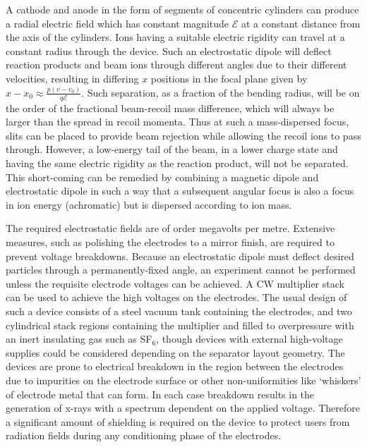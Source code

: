 A cathode and anode in the form of segments of concentric cylinders can produce a radial electric field which has constant magnitude $\mathcal{E}$  at a constant distance from the axis of the cylinders.   Ions having a suitable electric rigidity can travel at a constant radius through the device. Such an electrostatic dipole will deflect reaction products and beam ions through different angles due to their different velocities, resulting in differing $x$ positions in the focal plane given by $x-x_0\approx\frac{p(v-v_0)}{q\mathcal{E}}$. Such separation, as a fraction of the bending radius, will be on the order of the fractional beam-recoil mass difference, which will always be larger than the spread in recoil momenta. Thus at such a mass-dispersed focus, slits can be placed to provide beam rejection while allowing the recoil ions to pass through.   However, a low-energy tail of the beam, in a lower charge state and having the same electric rigidity as the reaction product, will not be separated. This short-coming can be remedied by combining a magnetic dipole and electrostatic dipole in such a way that a subsequent angular focus is also a focus in ion energy (achromatic) but is dispersed according to ion mass.  

The required electrostatic fields are of order megavolts per metre.  Extensive measures, such as polishing the electrodes to a mirror finish, are required to prevent voltage breakdowns.   Because an electrostatic dipole must deflect desired particles through a permanently-fixed angle,  an experiment  cannot be performed unless the requisite   electrode voltages can be achieved. A CW multiplier stack can be used to achieve the high voltages on the electrodes. The usual design of such a device consists of a steel vacuum tank containing the electrodes, and two cylindrical stack regions containing the multiplier and filled to overpressure with an inert insulating gas such as SF$_{6}$, though devices with external high-voltage supplies could be considered depending on the separator layout geometry. The devices are prone to electrical breakdown in the region between the electrodes due to impurities on the electrode surface or other non-uniformities like `whiskers' of electrode metal that can form. In each case breakdown results in the generation of x-rays with a spectrum dependent on the applied voltage. Therefore a significant amount of shielding is required on the device to protect users from radiation fields during any conditioning phase of the electrodes. 

